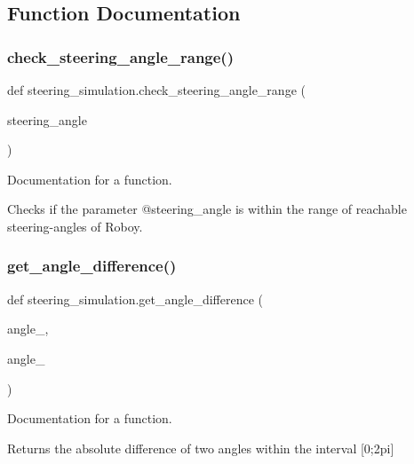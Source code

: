 \subsection{Function Documentation}
\mbox{\label{namespacesteering__simulation_abe8ecf85be641d2a56c547e4e27946ba}} 
\subsubsection{\texorpdfstring{check\_steering\_angle\_range()}{check\_steering\_angle\_range()}}
{\footnotesize\ttfamily def steering\+\_\+simulation.\+check\+\_\+steering\+\_\+angle\+\_\+range (\begin{DoxyParamCaption}\item[{}]{steering\+\_\+angle }\end{DoxyParamCaption})}



Documentation for a function. 

Checks if the parameter @steering\+\_\+angle is within the range of reachable steering-\/angles of Roboy. \mbox{\label{namespacesteering__simulation_a920f69692c79162b2296b1a220bba527}} 
\subsubsection{\texorpdfstring{get\_angle\_difference()}{get\_angle\_difference()}}
{\footnotesize\ttfamily def steering\+\_\+simulation.\+get\+\_\+angle\+\_\+difference (\begin{DoxyParamCaption}\item[{}]{angle\+\_,  }\item[{}]{angle\+\_ }\end{DoxyParamCaption})}



Documentation for a function. 

Returns the absolute difference of two angles within the interval \mbox{[}0;2pi\mbox{]} \mbox{\label{namespacesteering__simulation_a058dbff61afc8af058769267605ffc5a}} 
